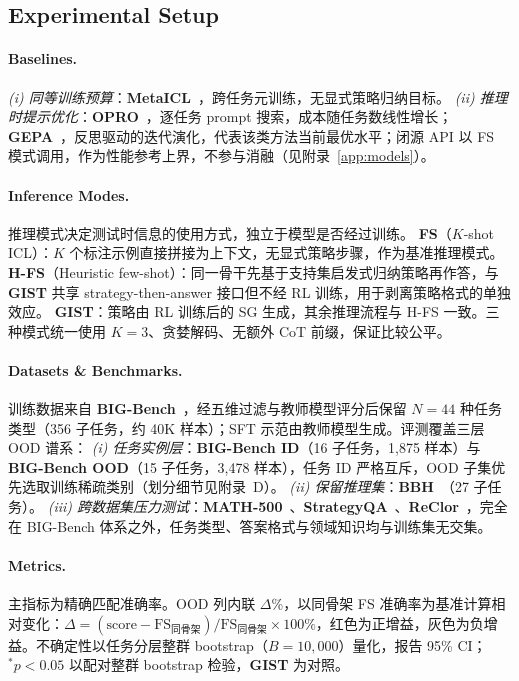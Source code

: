 \documentclass[11pt]{article}
\newcommand{\gist}{\textbf{GIST}}
\newcommand{\sg}{\textnormal{\textsc{SG}}}
\begin{document}
\subsection{Experimental Setup}
\label{sec:setup}

\paragraph{Baselines.}
\emph{(i) 同等训练预算}：\textbf{MetaICL}~\citep{min2022metaicl}，跨任务元训练，无显式策略归纳目标。
\emph{(ii) 推理时提示优化}：\textbf{OPRO}~\citep{yang2024opro}，逐任务 prompt 搜索，成本随任务数线性增长；\textbf{GEPA}~\citep{agrawal2025gepa}，反思驱动的迭代演化，代表该类方法当前最优水平；闭源 API 以 FS 模式调用，作为性能参考上界，不参与消融（见附录~\ref{app:models}）。

\paragraph{Inference Modes.}
推理模式决定测试时信息的使用方式，独立于模型是否经过训练。
\textbf{FS}（$K$-shot ICL）：$K$ 个标注示例直接拼接为上下文，无显式策略步骤，作为基准推理模式。
\textbf{H-FS}（Heuristic few-shot）：同一骨干先基于支持集启发式归纳策略再作答，与 \gist{} 共享 strategy-then-answer 接口但不经 RL 训练，用于剥离策略格式的单独效应。
\textbf{\gist{}}：策略由 RL 训练后的 \sg{} 生成，其余推理流程与 H-FS 一致。三种模式统一使用 $K{=}3$、贪婪解码、无额外 CoT 前缀，保证比较公平。

\paragraph{Datasets \& Benchmarks.}
训练数据来自 \textbf{BIG-Bench}~\citep{srivastava2023bigbench}，经五维过滤与教师模型评分后保留 $N{=}44$ 种任务类型（356 子任务，约 40K 样本）；SFT 示范由教师模型生成。评测覆盖三层 OOD 谱系：
\emph{(i) 任务实例层}：\textbf{BIG-Bench ID}（16 子任务，1,875 样本）与 \textbf{BIG-Bench OOD}（15 子任务，3,478 样本），任务 ID 严格互斥，OOD 子集优先选取训练稀疏类别（划分细节见附录~D）。
\emph{(ii) 保留推理集}：\textbf{BBH}~\citep{suzgun2022bbh}（27 子任务）。
\emph{(iii) 跨数据集压力测试}：\textbf{MATH-500}~\citep{lightman2023lets}、\textbf{StrategyQA}~\citep{geva2021strategyqa}、\textbf{ReClor}~\citep{yu2020reclor}，完全在 BIG-Bench 体系之外，任务类型、答案格式与领域知识均与训练集无交集。

\paragraph{Metrics.}
主指标为精确匹配准确率。OOD 列内联 $\Delta$\%，以同骨架 FS 准确率为基准计算相对变化：$\Delta = (\text{score} - \text{FS}_{\text{同骨架}}) / \text{FS}_{\text{同骨架}} \times 100\%$，红色为正增益，灰色为负增益。不确定性以任务分层整群 bootstrap（$B{=}10{,}000$）量化，报告 95\% CI；$^*p{<}0.05$ 以配对整群 bootstrap 检验，\gist{} 为对照。
\end{document}
